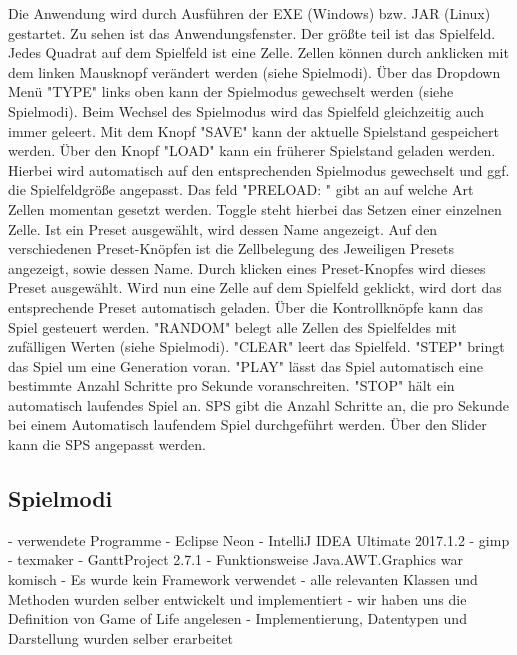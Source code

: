\documentclass[12pt]{article}
\theoremstyle{plain}
\begin{document}
\begin{linenumbers}
Die Anwendung wird durch Ausführen der EXE (Windows) bzw. JAR (Linux) gestartet. Zu sehen ist das Anwendungsfenster.
Der größte teil ist das Spielfeld. Jedes Quadrat auf dem Spielfeld ist eine Zelle. Zellen können durch anklicken mit dem linken Mausknopf verändert werden (siehe Spielmodi).
Über das Dropdown Menü "TYPE" links oben kann der Spielmodus gewechselt werden (siehe Spielmodi). Beim Wechsel des Spielmodus wird das Spielfeld gleichzeitig auch immer geleert.
Mit dem Knopf "SAVE" kann der aktuelle Spielstand gespeichert werden. Über den Knopf "LOAD" kann ein früherer Spielstand geladen werden. Hierbei wird automatisch auf den entsprechenden Spielmodus gewechselt und ggf. die Spielfeldgröße angepasst.
Das feld "PRELOAD: " gibt an auf welche Art Zellen momentan gesetzt werden. Toggle steht hierbei das Setzen einer einzelnen Zelle. Ist ein Preset ausgewählt, wird dessen Name angezeigt.
Auf den verschiedenen Preset-Knöpfen ist die Zellbelegung des Jeweiligen Presets angezeigt, sowie dessen Name. Durch klicken eines Preset-Knopfes wird dieses Preset ausgewählt. Wird nun eine Zelle auf dem Spielfeld geklickt, wird dort das entsprechende Preset automatisch geladen.
Über die Kontrollknöpfe kann das Spiel gesteuert werden. "RANDOM" belegt alle Zellen des Spielfeldes mit zufälligen Werten (siehe Spielmodi).
"CLEAR" leert das Spielfeld. "STEP" bringt das Spiel um eine Generation voran. "PLAY" lässt das Spiel automatisch eine bestimmte Anzahl Schritte pro Sekunde voranschreiten. "STOP" hält ein automatisch laufendes Spiel an.
SPS gibt die Anzahl Schritte an, die pro Sekunde bei einem Automatisch laufendem Spiel durchgeführt werden. Über den Slider kann die SPS angepasst werden.
\subsection{Spielmodi}



- verwendete Programme
	- Eclipse Neon
	- IntelliJ IDEA Ultimate 2017.1.2
	- gimp
	- texmaker
	- GanttProject 2.7.1
- Funktionsweise Java.AWT.Graphics war komisch
- Es wurde kein Framework verwendet
	- alle relevanten Klassen und Methoden wurden selber entwickelt und implementiert
- wir haben uns die Definition von Game of Life angelesen
	- Implementierung, Datentypen und Darstellung wurden selber erarbeitet


\end{linenumbers}
\end{document}
